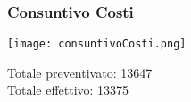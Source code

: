 \begin{frame}
  \frametitle{Consuntivo Costi}
  \texttt{[image: consuntivoCosti.png]}

  Totale preventivato: 13647\\
  Totale effettivo: 13375
\end{frame}
